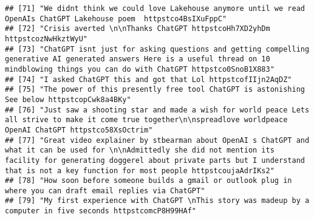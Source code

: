 \documentclass[
]{article}
\begin{document}
\begin{verbatim}
## [71] "We didnt think we could love Lakehouse anymore until we read OpenAIs ChatGPT Lakehouse poem  httpstco4BsIXuFppC"                                                                                                                                                                                                   
## [72] "Crisis averted \n\nThanks ChatGPT httpstcoHh7XD2yhDm httpstcozNwHkztWyU"                                                                                                                                                                                                                                           
## [73] "ChatGPT isnt just for asking questions and getting compelling generative AI generated answers Here is a useful thread on 10 mindblowing things you can do with ChatGPT httpstco0SnoB1X883"                                                                                                                         
## [74] "I asked ChatGPT this and got that Lol httpstcofIIjn2AqDZ"                                                                                                                                                                                                                                                          
## [75] "The power of this presently free tool ChatGPT is astonishing See below httpstcopCwk8a4BKy"                                                                                                                                                                                                                         
## [76] "Just saw a shooting star and made a wish for world peace Lets all strive to make it come true together\n\nspreadlove worldpeace OpenAI ChatGPT httpstco58XsOctrim"                                                                                                                                                 
## [77] "Great video explainer by stbearman about OpenAI s ChatGPT and what it can be used for \n\nAdmittedly she did not mention its facility for generating doggerel about private parts but I understand that is not a key function for most people httpstcoujaAdrIKs2"                                                  
## [78] "How soon before someone builds a gmail or outlook plug in where you can draft email replies via ChatGPT"                                                                                                                                                                                                           
## [79] "My first experience with ChatGPT \nThis story was madeup by a computer in five seconds httpstcomcP8H99HAf"                                                                                                                                                                                                         

\end{verbatim}
\end{document}
